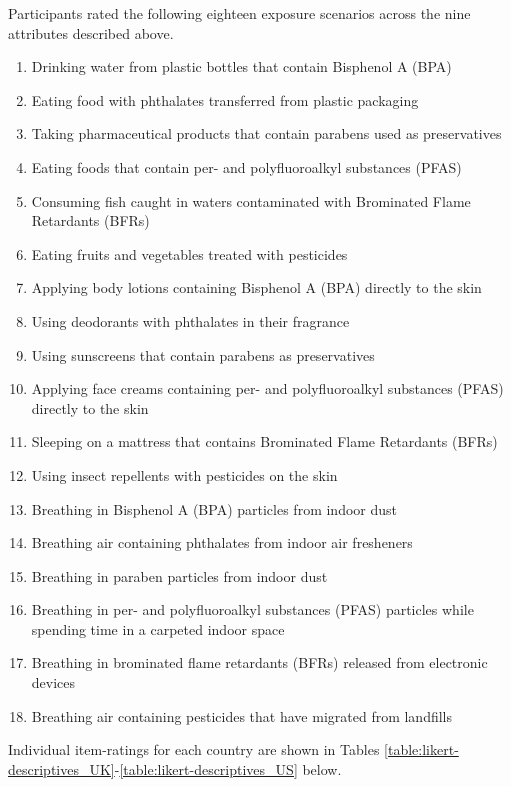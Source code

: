 Participants rated the following eighteen exposure scenarios across the nine attributes described above.
\begin{enumerate}
    \item Drinking water from plastic bottles that contain Bisphenol A (BPA)
    \item Eating food with phthalates transferred from plastic packaging
    \item Taking pharmaceutical products that contain parabens used as preservatives
    \item Eating foods that contain per- and polyfluoroalkyl substances (PFAS)
    \item Consuming fish caught in waters contaminated with Brominated Flame Retardants (BFRs)
    \item Eating fruits and vegetables treated with pesticides
    \item Applying body lotions containing Bisphenol A (BPA) directly to the skin
    \item Using deodorants with phthalates in their fragrance
    \item Using sunscreens that contain parabens as preservatives
    \item Applying face creams containing per- and polyfluoroalkyl substances (PFAS) directly to the skin
    \item Sleeping on a mattress that contains Brominated Flame Retardants (BFRs)
    \item Using insect repellents with pesticides on the skin
    \item Breathing in Bisphenol A (BPA) particles from indoor dust
    \item Breathing air containing phthalates from indoor air fresheners
    \item Breathing in paraben particles from indoor dust
    \item Breathing in per- and polyfluoroalkyl substances (PFAS) particles while spending time in a carpeted indoor space
    \item Breathing in brominated flame retardants (BFRs) released from electronic devices
    \item Breathing air containing pesticides that have migrated from landfills
\end{enumerate}\leavevmode

Individual item-ratings for each country are shown in Tables \ref{table:likert-descriptives_UK}-\ref{table:likert-descriptives_US} below.




